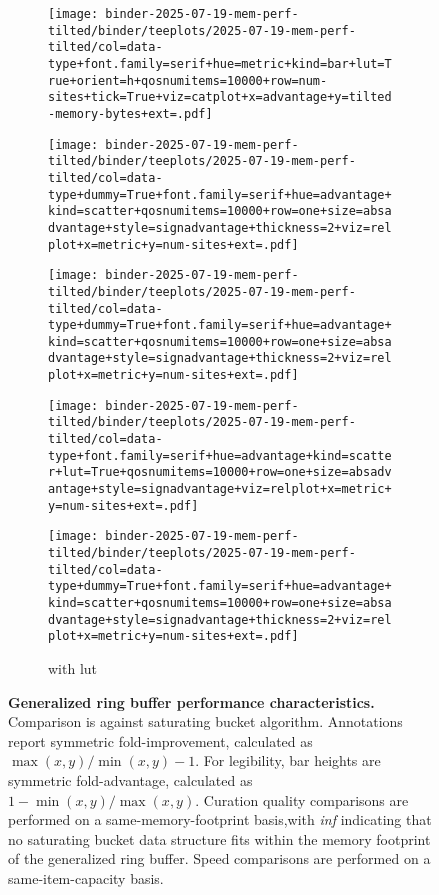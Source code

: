 \begin{figure*}
\begin{subfigure}{\textwidth}

\texttt{[image: binder-2025-07-19-mem-perf-tilted/binder/teeplots/2025-07-19-mem-perf-tilted/col=data-type+font.family=serif+hue=metric+kind=bar+lut=True+orient=h+qosnumitems=10000+row=num-sites+tick=True+viz=catplot+x=advantage+y=tilted-memory-bytes+ext=.pdf]}

\vspace{-1ex}

\texttt{[image: binder-2025-07-19-mem-perf-tilted/binder/teeplots/2025-07-19-mem-perf-tilted/col=data-type+dummy=True+font.family=serif+hue=advantage+kind=scatter+qosnumitems=10000+row=one+size=absadvantage+style=signadvantage+thickness=2+viz=relplot+x=metric+y=num-sites+ext=.pdf]}

\vspace{-3ex}

\texttt{[image: binder-2025-07-19-mem-perf-tilted/binder/teeplots/2025-07-19-mem-perf-tilted/col=data-type+dummy=True+font.family=serif+hue=advantage+kind=scatter+qosnumitems=10000+row=one+size=absadvantage+style=signadvantage+thickness=2+viz=relplot+x=metric+y=num-sites+ext=.pdf]}

\vspace{-1.2ex}

\texttt{[image: binder-2025-07-19-mem-perf-tilted/binder/teeplots/2025-07-19-mem-perf-tilted/col=data-type+font.family=serif+hue=advantage+kind=scatter+lut=True+qosnumitems=10000+row=one+size=absadvantage+style=signadvantage+viz=relplot+x=metric+y=num-sites+ext=.pdf]}

\vspace{-2.8ex}

\texttt{[image: binder-2025-07-19-mem-perf-tilted/binder/teeplots/2025-07-19-mem-perf-tilted/col=data-type+dummy=True+font.family=serif+hue=advantage+kind=scatter+qosnumitems=10000+row=one+size=absadvantage+style=signadvantage+thickness=2+viz=relplot+x=metric+y=num-sites+ext=.pdf]}

\vspace{-2ex}

\caption{with lut}
\label{fig:mem-perf-tilted:lut}
\end{subfigure}

\caption{
\textbf{Generalized ring buffer performance characteristics.}
\footnotesize
Comparison is against saturating bucket algorithm.
Annotations report symmetric fold-improvement, calculated as $\max(x, y) / \min(x, y) - 1$.
For legibility, bar heights are symmetric fold-advantage, calculated as $1 - \min(x, y) / \max(x, y)$.
Curation quality comparisons are performed on a same-memory-footprint basis,with \textit{inf} indicating that no saturating bucket data structure fits within the memory footprint of the generalized ring buffer.
Speed comparisons are performed on a same-item-capacity basis.
}
\label{fig:mem-perf-tilted}

\end{figure*}
